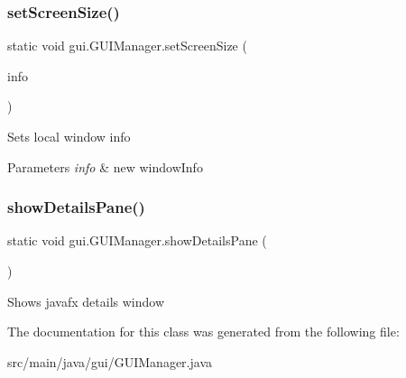 \subsubsection{\texorpdfstring{set\+Screen\+Size()}{setScreenSize()}}
{\footnotesize\ttfamily static void gui.\+G\+U\+I\+Manager.\+set\+Screen\+Size (\begin{DoxyParamCaption}\item[{Window\+Info}]{info }\end{DoxyParamCaption})\hspace{0.3cm}{\ttfamily [static]}}

Sets local window info 
\begin{DoxyParams}{Parameters}
{\em info} & new window\+Info \\
\hline
\end{DoxyParams}
\mbox{\label{classgui_1_1_g_u_i_manager_a53027e64ff28a5c403ca6c5701760e41}} 
\subsubsection{\texorpdfstring{show\+Details\+Pane()}{showDetailsPane()}}
{\footnotesize\ttfamily static void gui.\+G\+U\+I\+Manager.\+show\+Details\+Pane (\begin{DoxyParamCaption}{ }\end{DoxyParamCaption})\hspace{0.3cm}{\ttfamily [static]}}

Shows javafx details window 

The documentation for this class was generated from the following file\+:\begin{DoxyCompactItemize}
\item 
src/main/java/gui/G\+U\+I\+Manager.\+java\end{DoxyCompactItemize}
